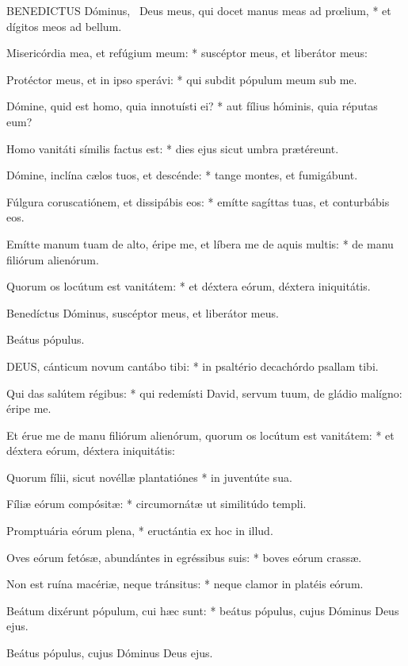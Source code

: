 
\lettrine[lines=2]{B}{ENEDICTUS} Dóminus, \textdagger\ Deus meus, qui docet manus meas ad prœlium, * et dígitos meos ad bellum.

Misericórdia mea, et refúgium meum: * suscéptor meus, et liberátor meus:

Protéctor meus, et in ipso sperávi: * qui subdit pópulum meum sub me.

Dómine, quid est homo, quia innotuísti ei? * aut fílius hóminis, quia réputas eum?

Homo vanitáti símilis factus est: * dies ejus sicut umbra prætéreunt.

Dómine, inclína cælos tuos, et descénde: * tange montes, et fumigábunt.

Fúlgura coruscatiónem, et dissipábis eos: * emítte sagíttas tuas, et conturbábis eos.

Emítte manum tuam de alto, éripe me, et líbera me de aquis multis: * de manu filiórum alienórum.

Quorum os locútum est vanitátem: * et déxtera eórum, déxtera iniquitátis.

 Benedíctus Dóminus, suscéptor meus, et liberátor meus.

 Beátus pópulus.


\lettrine[lines=2]{D}{EUS}, cánticum novum cantábo tibi: * in psaltério decachórdo psallam tibi.

Qui das salútem régibus: * qui redemísti David, servum tuum, de gládio malígno: éripe me.

Et érue me de manu filiórum alienórum, quorum os locútum est vanitátem: * et déxtera eórum, déxtera iniquitátis:

Quorum fílii, sicut novéllæ plantatiónes * in juventúte sua.

Fíliæ eórum compósitæ: * circumornátæ ut similitúdo templi.

Promptuária eórum plena, * eructántia ex hoc in illud.

Oves eórum fetósæ, abundántes in egréssibus suis: * boves eórum crassæ.

Non est ruína macériæ, neque tránsitus: * neque clamor in platéis eórum.

Beátum dixérunt pópulum, cui hæc sunt: * beátus pópulus, cujus Dóminus Deus ejus.

 Beátus pópulus, cujus Dóminus Deus ejus.

